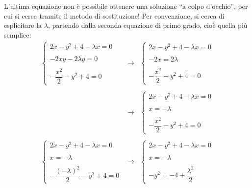 \documentclass[a4paper]{article}
\newcommand{\dquotes}[1]{``#1''}
\begin{document}
	\noindent
	L'ultima equazione non è possibile ottenere una soluzione \dquotes{a colpo d'occhio}, per cui si cerca tramite il metodo di sostituzione! Per convenzione, si cerca di esplicitare la $\lambda$, partendo dalla seconda equazione di primo grado, cioè quella più semplice:
	\begin{equation*}
		\begin{array}{rcl}
			\begin{cases}
				2x - y^{2} + 4 - \lambda x = 0 \\
				\\
				-2xy - 2\lambda y = 0 \\
				\\
				- \dfrac{x^{2}}{2} - y^{2} + 4 = 0
			\end{cases}
			&\rightarrow&
			\begin{cases}
				2x - y^{2} + 4 - \lambda x = 0 \\
				\\
				-2x = 2\lambda \\
				\\
				- \dfrac{x^{2}}{2} - y^{2} + 4 = 0
			\end{cases} \\
			\\
			&\rightarrow&
			\begin{cases}
				2x - y^{2} + 4 - \lambda x = 0 \\
				\\
				x = -\lambda \\
				\\
				- \dfrac{x^{2}}{2} - y^{2} + 4 = 0
			\end{cases} \\
			\\
			\begin{cases}
				2x - y^{2} + 4 - \lambda x = 0 \\
				\\
				x = -\lambda \\
				\\
				- \dfrac{\left(-\lambda\right)^{2}}{2} - y^{2} + 4 = 0
			\end{cases}
			&\rightarrow&
			\begin{cases}
				2x - y^{2} + 4 - \lambda x = 0 \\
				\\
				x = -\lambda \\
				\\
				-y^{2} = -4 + \dfrac{\lambda^{2}}{2}
			\end{cases} \\

\end{array}
\end{equation*}
\end{document}
